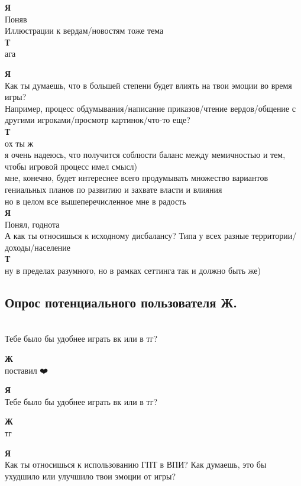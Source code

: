 \textbf{Я} \\
Поняв\\
Иллюстрации к вердам/новостям тоже тема\\

\textbf{Т} \\
ага

\textbf{Я} \\
Как ты думаешь, что в большей степени будет влиять на твои эмоции во время игры?\\

Например, процесс обдумывания/написание приказов/чтение вердов/общение с другими игроками/просмотр картинок/что-то еще?\\

\textbf{Т} \\
ох ты ж \\
я очень надеюсь, что получится соблюсти баланс между мемичностью и тем, чтобы игровой процесс имел смысл)\\

мне, конечно, будет интереснее всего продумывать множество вариантов гениальных планов по развитию и захвате власти и влияния\\

но в целом все вышеперечисленное мне в радость\\

\textbf{Я} \\
Понял, годнота \\
А как ты относишься к исходному дисбалансу? Типа у всех разные территории/доходы/население\\

\textbf{Т} \\
ну в пределах разумного, но в рамках сеттинга так и должно быть же)\\
\subsection{Опрос потенциального пользователя Ж.}\\
Тебе было бы удобнее играть вк или в тг?

\textbf{Ж} \\
поставил ❤️🎅

\textbf{Я} \\
Тебе было бы удобнее играть вк или в тг?

\textbf{Ж} \\
тг

\textbf{Я} \\
Как ты относишься к использованию ГПТ в ВПИ? Как думаешь, это бы ухудшило или улучшило твои эмоции от игры?


